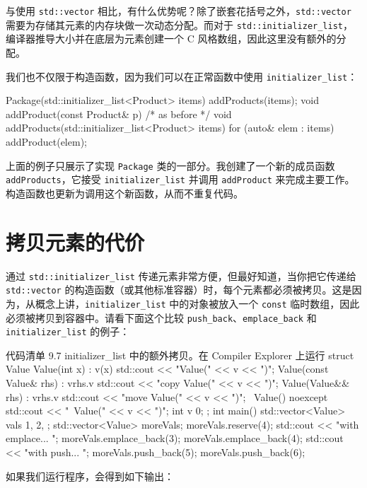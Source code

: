 与使用 \texttt{std::vector} 相比，有什么优势呢？除了嵌套花括号之外，\texttt{std::vector} 需要为存储其元素的内存块做一次动态分配。而对于 \texttt{std::initializer\_list}，编译器推导大小并在底层为元素创建一个 C 风格数组，因此这里没有额外的分配。

我们也不仅限于构造函数，因为我们可以在正常函数中使用 \texttt{initializer\_list}：

\begin{codebox}[cpp]
Package(std::initializer_list<Product> items) {
    addProducts(items);
}
void addProduct(const Product& p) { /* as before */ }
void addProducts(std::initializer_list<Product> items) {
    for (auto& elem : items)
        addProduct(elem);
}
\end{codebox}

上面的例子只展示了实现 \texttt{Package} 类的一部分。我创建了一个新的成员函数 \texttt{addProducts}，它接受 \texttt{initializer\_list} 并调用 \texttt{addProduct} 来完成主要工作。构造函数也更新为调用这个新函数，从而不重复代码。

\section{拷贝元素的代价}

通过 \texttt{std::initializer\_list} 传递元素非常方便，但最好知道，当你把它传递给 \texttt{std::vector} 的构造函数（或其他标准容器）时，每个元素都必须被拷贝。这是因为，从概念上讲，\texttt{initializer\_list} 中的对象被放入一个 \texttt{const} 临时数组，因此必须被拷贝到容器中。请看下面这个比较 \texttt{push\_back}、\texttt{emplace\_back} 和 \texttt{initializer\_list} 的例子：

\begin{codeboxt}[cpp]{代码清单 9.7 initializer\_list 中的额外拷贝。在 Compiler Explorer 上运行}
struct Value {
    Value(int x) : v(x) { std::cout << "Value(" << v << ")\n"; }
    Value(const Value& rhs) : v{rhs.v}
    {std::cout << "copy Value(" << v << ")\n"; }
    Value(Value&& rhs) : v{rhs.v}
    {std::cout << "move Value(" << v << ")\n"; }
    ~Value() noexcept { std::cout << "~Value(" << v << ")\n"; }
    int v {0};
};
int main() {
    std::vector<Value> vals {
        1, 2,
    };
    std::vector<Value> moreVals;
    moreVals.reserve(4);
    std::cout << "with emplace... \n";
    moreVals.emplace_back(3);
    moreVals.emplace_back(4);
    std::cout << "with push... \n";
    moreVals.push_back(5);
    moreVals.push_back(6);
}
\end{codeboxt}

如果我们运行程序，会得到如下输出：

